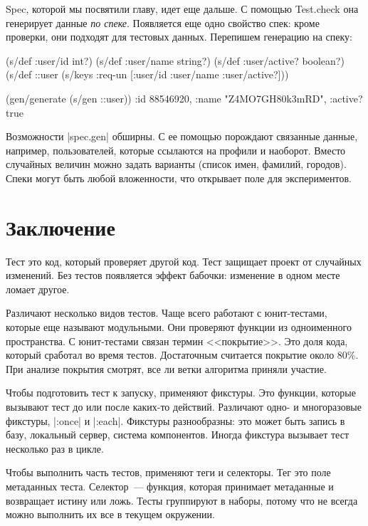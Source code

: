 Spec, которой мы посвятили главу, идет еще дальше. С помощью Test.check она
генерирует данные \emph{по спеке}. Появляется еще одно свойство спек: кроме
проверки, они подходят для тестовых данных. Перепишем генерацию на спеку:

\begin{english}
  \begin{clojure}
(s/def :user/id int?)
(s/def :user/name string?)
(s/def :user/active? boolean?)
(s/def ::user (s/keys :req-un [:user/id :user/name :user/active?]))

(gen/generate (s/gen ::user))
{:id 88546920, :name "Z4MO7GH80k3mRD", :active? true}
  \end{clojure}
\end{english}

Возможности \spverb|spec.gen| обширны. С ее помощью порождают связанные данные,
например, пользователей, которые ссылаются на профили и наоборот. Вместо
случайных величин можно задать варианты (список имен, фамилий, городов). Спеки
могут быть любой вложенности, что открывает поле для экспериментов.

\section{Заключение}

Тест это код, который проверяет другой код. Тест защищает проект от случайных
изменений. Без тестов появляется эффект бабочки: изменение в одном месте ломает
другое.

Различают несколько видов тестов. Чаще всего работают с юнит-тестами, которые
еще называют модульными. Они проверяют функции из одноименного пространства. С
юнит-тестами связан термин <<покрытие>>. Это доля кода, который сработал во
время тестов. Достаточным считается покрытие около 80\%. При анализе покрытия
смотрят, все ли ветки алгоритма приняли участие.

Чтобы подготовить тест к запуску, применяют фикстуры. Это функции, которые
вызывают тест до или после каких-то действий. Различают одно- и многоразовые
фикстуры, \spverb|:once| и \spverb|:each|. Фикстуры разнообразны: это может быть
запись в базу, локальный сервер, система компонентов. Иногда фикстура вызывает
тест несколько раз в цикле.

Чтобы выполнить часть тестов, применяют теги и селекторы. Тег это поле
метаданных теста. Селектор~--- функция, которая принимает метаданные и
возвращает истину или ложь. Тесты группируют в наборы, потому что не всегда
можно выполнить их все в текущем окружении.


